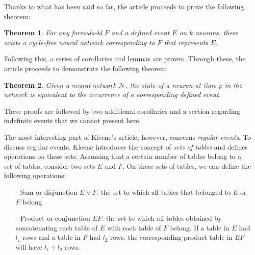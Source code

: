 \documentclass[10pt]{article}
\newtheorem{thm}{Theorem}
\begin{document}
Thanks to what has been said so far, the article proceeds to prove the following theorem:

\begin{thm}
	For any formula-kl $F$ and a defined event $E$ on $k$ neurons, there exists a cycle-free neural network corresponding to $F$ that represents $E$.
\end{thm}

Following this, a series of corollaries and lemmas are proven. Through these, the article proceeds to demonstrate the following theorem:

\begin{thm}
	Given a neural network $\mathcal{N}$, the state of a neuron at time $p$ in the network is equivalent to the occurrence of a corresponding defined event.
\end{thm}

These proofs are followed by two additional corollaries and a section regarding indefinite events that we cannot present here. 

The most interesting part of Kleene's article, however, concerns \emph{regular events}. To discuss regular events, Kleene introduces the concept of \emph{sets of tables} and defines operations on these sets. Assuming that a certain number of tables belong to a set of tables, consider two sets $E$ and $F$. On these sets of tables, we can define the following operations:
\begin{itemize}
	\item[-] Sum or disjunction $E \vee F$: the set to which all tables that belonged to $E$ or $F$ belong
	\item[-] Product or conjunction $EF$: the set to which all tables obtained by concatenating each table of $E$ with each table of $F$ belong. If a table in $E$ had $l_1$ rows and a table in $F$ had $l_2$ rows, the corresponding product table in $EF$ will have $l_1+l_2$ rows.
\end{itemize}
\end{document}
